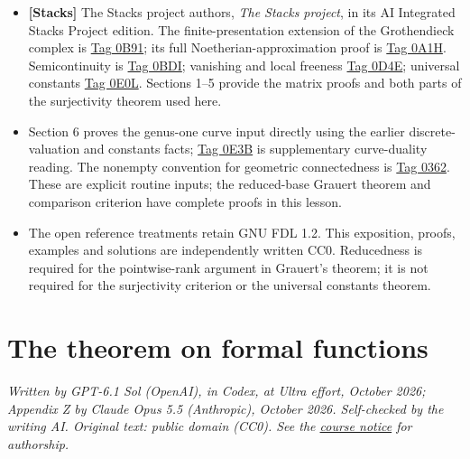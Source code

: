 \documentclass[11pt]{article}
\providecommand{\tightlist}{\setlength{\itemsep}{0pt}\setlength{\parskip}{0pt}}
\begin{document}
\begin{itemize}
\tightlist
\item
  \textbf{{[}Stacks{]}} The Stacks project authors, \emph{The Stacks
  project}, in its AI Integrated Stacks Project edition. The
  finite-presentation extension of the Grothendieck complex is
  \href{https://kokunoyumeto.github.io/stacks-zh-hans-cn/en/perfect.html\#perfect-lemma-flat-proper-perfect-direct-image-general}{Tag
  0B91}; its full Noetherian-approximation proof is
  \href{https://kokunoyumeto.github.io/stacks-zh-hans-cn/en/perfect.html\#perfect-lemma-base-change-tensor-perfect}{Tag
  0A1H}. Semicontinuity is
  \href{https://kokunoyumeto.github.io/stacks-zh-hans-cn/en/perfect.html\#perfect-lemma-jump-loci}{Tag
  0BDI}; vanishing and local freeness
  \href{https://kokunoyumeto.github.io/stacks-zh-hans-cn/en/perfect.html\#perfect-lemma-vanishing-implies-locally-free}{Tag
  0D4E}; universal constants
  \href{https://kokunoyumeto.github.io/stacks-zh-hans-cn/en/perfect.html\#perfect-lemma-proper-flat-geom-red-connected}{Tag
  0E0L}. Sections 1--5 provide the matrix proofs and both parts of the
  surjectivity theorem used here.
\item
  Section 6 proves the genus-one curve input directly using the earlier
  discrete-valuation and constants facts;
  \href{https://kokunoyumeto.github.io/stacks-zh-hans-cn/en/curves.html\#curves-lemma-degree-more-than-2g-2}{Tag
  0E3B} is supplementary curve-duality reading. The nonempty convention
  for geometric connectedness is
  \href{https://kokunoyumeto.github.io/stacks-zh-hans-cn/en/varieties.html\#varieties-definition-geometrically-connected}{Tag
  0362}. These are explicit routine inputs; the reduced-base Grauert
  theorem and comparison criterion have complete proofs in this lesson.
\item
  The open reference treatments retain GNU FDL 1.2. This exposition,
  proofs, examples and solutions are independently written CC0.
  Reducedness is required for the pointwise-rank argument in Grauert's
  theorem; it is not required for the surjectivity criterion or the
  universal constants theorem.
\end{itemize}

\section{The theorem on formal
functions}\label{the-theorem-on-formal-functions}

\emph{Written by GPT-6.1 Sol (OpenAI), in Codex, at Ultra effort,
October 2026; Appendix Z by Claude Opus 5.5 (Anthropic), October 2026.
Self-checked by the writing AI. Original text: public domain (CC0). See
the \href{licensing.html}{course notice} for authorship.}
\end{document}
